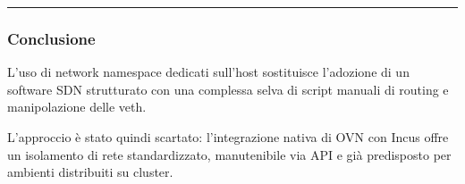 \begin{center}\rule{0.5\linewidth}{0.5pt}\end{center}

\subsubsection{Conclusione}\label{conclusione}

L'uso di network namespace dedicati sull'host sostituisce l'adozione di
un software SDN strutturato con una complessa selva di script manuali di
routing e manipolazione delle veth.

L'approccio è stato quindi scartato: l'integrazione nativa di OVN con
Incus offre un isolamento di rete standardizzato, manutenibile via API e
già predisposto per ambienti distribuiti su cluster.

